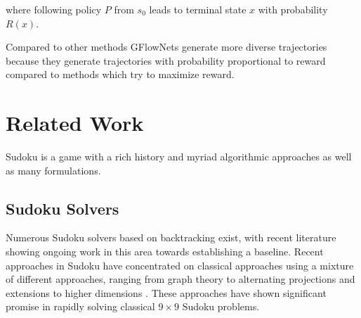 \documentclass[10pt, reqno, letterpaper, twoside]{amsart}
\begin{document}
where following policy $P$ from $s_0$ leads to terminal state $x$ with probability $R(x)$. \cite{bengio2023gflownet} %

Compared to other methods GFlowNets generate more diverse trajectories because they generate trajectories with probability proportional to reward compared to methods which try to maximize reward.

\section{Related Work}

Sudoku is a game with a rich history \cite{sudokuHistoryWayback} and myriad algorithmic approaches as well as many formulations. \cite{10.1587/transfun.e100.a.2641}

\subsection{Sudoku Solvers}
Numerous Sudoku solvers based on backtracking \cite{chi2013techniques}\cite{10.29007/79mc} exist, with recent \cite{10.1109/iadcc.2014.6779291} \cite{10.5220/0001659502460254}\cite{10.1007/s11786-017-0322-4} literature showing ongoing work in this area towards establishing a baseline.  Recent approaches in Sudoku have concentrated on classical approaches using a mixture of different approaches, ranging from graph theory\cite{10.46460/ijiea.982908} to alternating projections\cite{10.5120/ijca2019918439} and extensions to higher dimensions \cite{10.1007/s11786-017-0322-4}.  These approaches have shown significant promise in rapidly solving classical $9\times 9$ Sudoku problems.
\end{document}
